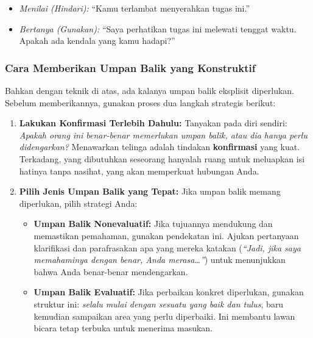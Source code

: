 \documentclass[
  letterpaper,
  DIV=11,
  numbers=noendperiod]{scrreprt}
\begin{document}
\begin{itemize}
  \begin{itemize}
  \item
    \emph{Menilai (Hindari):} ``Kamu terlambat menyerahkan tugas ini.''
  \item
    \emph{Bertanya (Gunakan):} ``Saya perhatikan tugas ini melewati
    tenggat waktu. Apakah ada kendala yang kamu hadapi?''
  \end{itemize}
\end{itemize}

\subsubsection{\texorpdfstring{\textbf{Cara Memberikan Umpan Balik yang
Konstruktif}}{Cara Memberikan Umpan Balik yang Konstruktif}}\label{cara-memberikan-umpan-balik-yang-konstruktif}

Bahkan dengan teknik di atas, ada kalanya umpan balik eksplisit
diperlukan. Sebelum memberikannya, gunakan proses dua langkah strategis
berikut:

\begin{enumerate}
\def\labelenumi{\arabic{enumi}.}
\item
  \textbf{Lakukan Konfirmasi Terlebih Dahulu:} Tanyakan pada diri
  sendiri: \emph{Apakah orang ini benar-benar memerlukan umpan balik,
  atau dia hanya perlu didengarkan?} Menawarkan telinga adalah tindakan
  \textbf{konfirmasi} yang kuat. Terkadang, yang dibutuhkan seseorang
  hanyalah ruang untuk meluapkan isi hatinya tanpa nasihat, yang akan
  memperkuat hubungan Anda.
\item
  \textbf{Pilih Jenis Umpan Balik yang Tepat:} Jika umpan balik memang
  diperlukan, pilih strategi Anda:

  \begin{itemize}
  \item
    \textbf{Umpan Balik Nonevaluatif:} Jika tujuannya mendukung dan
    memastikan pemahaman, gunakan pendekatan ini. Ajukan pertanyaan
    klarifikasi dan parafrasakan apa yang mereka katakan (\emph{``Jadi,
    jika saya memahaminya dengan benar, Anda merasa\ldots{}''}) untuk
    menunjukkan bahwa Anda benar-benar mendengarkan.
  \item
    \textbf{Umpan Balik Evaluatif:} Jika perbaikan konkret diperlukan,
    gunakan struktur ini: \emph{selalu mulai dengan sesuatu yang baik
    dan tulus}, baru kemudian sampaikan area yang perlu diperbaiki. Ini
    membantu lawan bicara tetap terbuka untuk menerima masukan.
  \end{itemize}
\end{enumerate}
\end{document}
